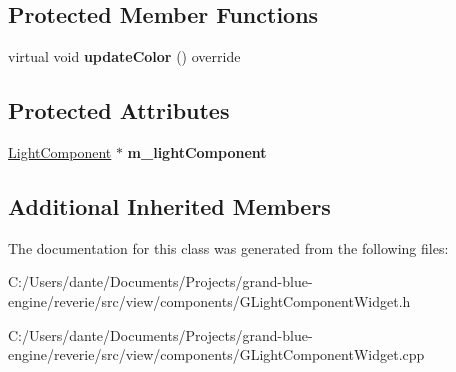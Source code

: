 \subsection*{Protected Member Functions}
\begin{DoxyCompactItemize}
\item 
\mbox{\label{classrev_1_1_view_1_1_light_specular_color_widget_a0d41500631e46c0fd51a72ebc8715032}} 
virtual void {\bfseries update\+Color} () override
\end{DoxyCompactItemize}
\subsection*{Protected Attributes}
\begin{DoxyCompactItemize}
\item 
\mbox{\label{classrev_1_1_view_1_1_light_specular_color_widget_a9276b95b6f06cdee44ca1664633290df}} 
\mbox{\hyperlink{classrev_1_1_light_component}{Light\+Component}} $\ast$ {\bfseries m\+\_\+light\+Component}
\end{DoxyCompactItemize}
\subsection*{Additional Inherited Members}


The documentation for this class was generated from the following files\+:\begin{DoxyCompactItemize}
\item 
C\+:/\+Users/dante/\+Documents/\+Projects/grand-\/blue-\/engine/reverie/src/view/components/G\+Light\+Component\+Widget.\+h\item 
C\+:/\+Users/dante/\+Documents/\+Projects/grand-\/blue-\/engine/reverie/src/view/components/G\+Light\+Component\+Widget.\+cpp\end{DoxyCompactItemize}

